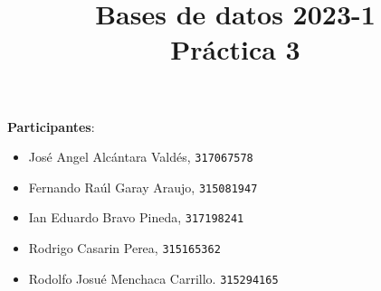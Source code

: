 \documentclass[12pt,letterpaper]{article}
\title{Bases de datos 2023-1\\
Práctica 3}
\begin{document}
\maketitle

\textbf{Participantes}:
\begin{itemize}
	\item José Angel Alcántara Valdés, \texttt{317067578}\\
	\item Fernando Raúl Garay Araujo, \texttt{315081947}\\
	\item Ian Eduardo Bravo Pineda, \texttt{317198241}\\
	\item Rodrigo Casarin Perea, \texttt{315165362}\\
	\item Rodolfo Josué Menchaca Carrillo. \texttt{315294165}\\
\end{itemize}
\end{document}
